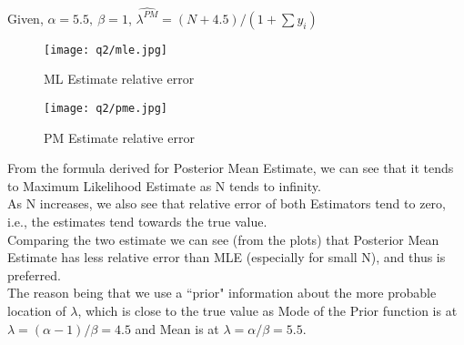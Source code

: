 \documentclass[11pt, fleqn]{article}
\begin{document}
Given, $\alpha = 5.5,\ \beta = 1$, $\hat{\lambda^{PM}} = (N+4.5) / (1+\sum y_i)$

\begin{figure}[H]
    \centering
    \texttt{[image: q2/mle.jpg]}
    \caption{ML Estimate relative error}
\end{figure}

\begin{figure}[H]
    \centering
    \texttt{[image: q2/pme.jpg]}
    \caption{PM Estimate relative error}
\end{figure}

From the formula derived for Posterior Mean Estimate, we can see that it tends to Maximum Likelihood Estimate as N tends to infinity. \\
As N increases, we also see that relative error of both Estimators tend to zero, i.e., the estimates tend towards the true value. \\
Comparing the two estimate we can see (from the plots) that Posterior Mean Estimate has less relative error than MLE (especially for small N), and thus is preferred. \\
The reason being that we use a ``prior" information about the more probable location of $\lambda$, which is close to the true value as Mode of the Prior function is at $\lambda = (\alpha - 1)/\beta = 4.5$ and Mean is at $\lambda = \alpha/\beta = 5.5$.
\end{document}
